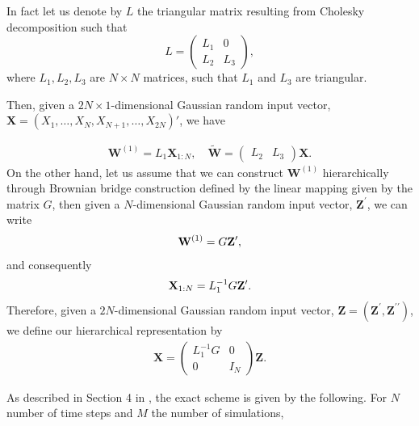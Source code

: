 In fact let us denote by $L$ the triangular matrix resulting from Cholesky decomposition such that 
\[
L=
\left(
\begin{array}{c|c}
L_1& 0 \\
L_2 & L_3
\end{array}
\right),
\]
where $L_1, L_2,L_3$ are $N \times N$ matrices, such that $L_1$ and $L_3$ are triangular.

Then, given  a $2 N \times 1$-dimensional Gaussian random input vector, $\mathbf{X}=(X_1, \dots,X_N, X_{N+1}, \dots, X_{2N})'$, we have

\begin{align}
\mathbf{W}^{(1)}=L_1 \mathbf{X}_{1:N}, \quad \widetilde{\mathbf{W}}= 
\left(
\begin{array}{c|c}
L_2 & L_3 
\end{array}
\right) \mathbf{X}.
\end{align}
On the other hand, let us assume that we can construct $\mathbf{W}^{(1)}$ hierarchically  through  Brownian bridge construction defined by the linear mapping given by the matrix $G$, then given a $ N$-dimensional Gaussian random input vector, $\mathbf{Z}^\prime$, we can write
\begin{align*}
\mathbf{W}^{(1)}=G  \mathbf{Z}^\prime ,
\end{align*}
and consequently
\begin{align*}
 \mathbf{X}_{1:N}= L_1^{-1} G  \mathbf{Z}^\prime .
\end{align*}
Therefore, given a $2 N$-dimensional Gaussian random input vector, $\mathbf{Z}=(\mathbf{Z}^\prime,\mathbf{Z}^{\prime \prime})$, we define our hierarchical representation by
\begin{align}\label{eq: Construction}
\mathbf{X}=\left(
\begin{array}{c|c}
L_1^{-1} G & 0\\
0 & I_{N} 
\end{array}
\right) \mathbf{Z}.
\end{align}

As described in Section 4 in \cite{bayer2016pricing}, the exact scheme is given by the following. For $N$ number of time steps and $M$ the number of simulations,

